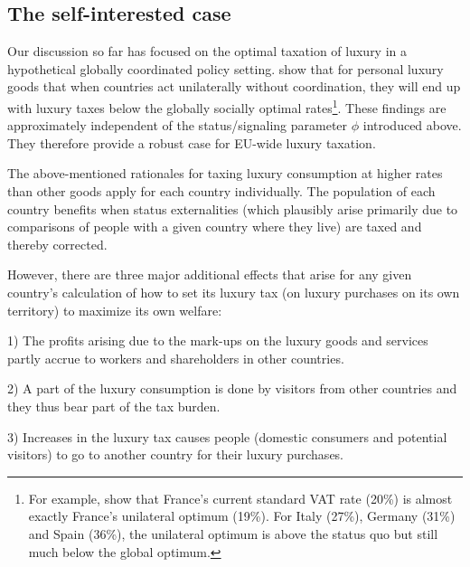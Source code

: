 \documentclass{article}
\begin{document}
\subsection{The self-interested case} %

Our discussion so far has focused on the optimal taxation of luxury in a hypothetical globally coordinated policy setting. %
\citet{Xie2026} show that for personal luxury goods that when countries act unilaterally without coordination, they will end up with luxury taxes below the globally socially optimal rates\footnote{For example, \citet{Xie2026} show that France's current standard VAT rate (20\%) is almost exactly France's unilateral optimum (19\%). For Italy (27\%), Germany (31\%) and Spain (36\%), the unilateral optimum is above the status quo but still much below the global optimum.}. %
These findings are approximately independent of the status/signaling parameter $\phi$ introduced above. They therefore provide a robust case for EU-wide luxury taxation.

The above-mentioned rationales for taxing luxury consumption at higher rates than other goods apply for each country individually. The population of each country benefits when status externalities (which plausibly arise primarily due to comparisons of people with a given country where they live) are taxed and thereby corrected.

However, there are three major additional effects that arise for any given country's calculation of how to set its luxury tax (on luxury purchases on its own territory) to maximize its own welfare:

1) The profits arising due to the mark-ups on the luxury goods and services partly accrue to workers and shareholders in other countries. %

2) A part of the luxury consumption is done by visitors from other countries and they thus bear part of the tax burden.

3) Increases in the luxury tax causes people (domestic consumers and potential visitors) to go to another country for their luxury purchases. %
\end{document}
